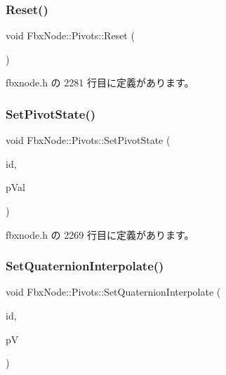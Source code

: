 \mbox{\label{class_fbx_node_1_1_pivots_ac7d51e9cdd4b9c8a384e94b8d868800c}} 
\subsubsection{\texorpdfstring{Reset()}{Reset()}}
{\footnotesize\ttfamily void Fbx\+Node\+::\+Pivots\+::\+Reset (\begin{DoxyParamCaption}{ }\end{DoxyParamCaption})\hspace{0.3cm}{\ttfamily [inline]}}



 fbxnode.\+h の 2281 行目に定義があります。

\mbox{\label{class_fbx_node_1_1_pivots_abb34f894cdbda44914d8e707d7d7b737}} 
\subsubsection{\texorpdfstring{Set\+Pivot\+State()}{SetPivotState()}}
{\footnotesize\ttfamily void Fbx\+Node\+::\+Pivots\+::\+Set\+Pivot\+State (\begin{DoxyParamCaption}\item[{int}]{id,  }\item[{\hyperlink{class_fbx_node_a153fc75958227fc6728a2233b630b58a}{Fbx\+Node\+::\+E\+Pivot\+State}}]{p\+Val }\end{DoxyParamCaption})\hspace{0.3cm}{\ttfamily [inline]}}



 fbxnode.\+h の 2269 行目に定義があります。

\mbox{\label{class_fbx_node_1_1_pivots_a8a9dcfd646b6aa80d02952f410140b66}} 
\subsubsection{\texorpdfstring{Set\+Quaternion\+Interpolate()}{SetQuaternionInterpolate()}}
{\footnotesize\ttfamily void Fbx\+Node\+::\+Pivots\+::\+Set\+Quaternion\+Interpolate (\begin{DoxyParamCaption}\item[{int}]{id,  }\item[{\hyperlink{fbxmath_8h_a9c7a0dfb52c83256d4a92c5c6d1be72a}{E\+Fbx\+Quat\+Interp\+Mode}}]{pV }\end{DoxyParamCaption})\hspace{0.3cm}{\ttfamily [inline]}}



